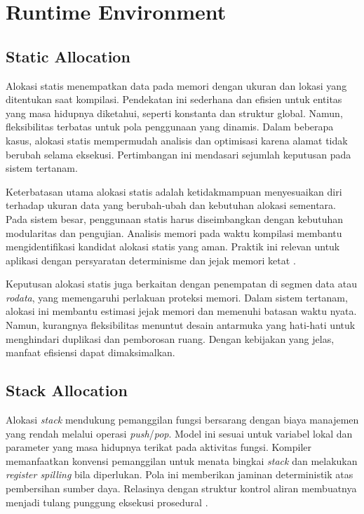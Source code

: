 \documentclass[../main.tex]{subfiles}
\begin{document}
\section{Runtime Environment}
\subsection{Static Allocation}
Alokasi statis menempatkan data pada memori dengan ukuran dan lokasi yang ditentukan saat kompilasi. Pendekatan ini sederhana dan efisien untuk entitas yang masa hidupnya diketahui, seperti konstanta dan struktur global. Namun, fleksibilitas terbatas untuk pola penggunaan yang dinamis. Dalam beberapa kasus, alokasi statis mempermudah analisis dan optimisasi karena alamat tidak berubah selama eksekusi. Pertimbangan ini mendasari sejumlah keputusan pada sistem tertanam.

Keterbatasan utama alokasi statis adalah ketidakmampuan menyesuaikan diri terhadap ukuran data yang berubah-ubah dan kebutuhan alokasi sementara. Pada sistem besar, penggunaan statis harus diseimbangkan dengan kebutuhan modularitas dan pengujian. Analisis memori pada waktu kompilasi membantu mengidentifikasi kandidat alokasi statis yang aman. Praktik ini relevan untuk aplikasi dengan persyaratan determinisme dan jejak memori ketat \citep{WikiMemory}.

Keputusan alokasi statis juga berkaitan dengan penempatan di segmen data atau \emph{rodata}, yang memengaruhi perlakuan proteksi memori. Dalam sistem tertanam, alokasi ini membantu estimasi jejak memori dan memenuhi batasan waktu nyata. Namun, kurangnya fleksibilitas menuntut desain antarmuka yang hati-hati untuk menghindari duplikasi dan pemborosan ruang. Dengan kebijakan yang jelas, manfaat efisiensi dapat dimaksimalkan.

\subsection{Stack Allocation}
Alokasi \emph{stack} mendukung pemanggilan fungsi bersarang dengan biaya manajemen yang rendah melalui operasi \emph{push}/\emph{pop}. Model ini sesuai untuk variabel lokal dan parameter yang masa hidupnya terikat pada aktivitas fungsi. Kompiler memanfaatkan konvensi pemanggilan untuk menata bingkai \emph{stack} dan melakukan \emph{register spilling} bila diperlukan. Pola ini memberikan jaminan deterministik atas pembersihan sumber daya. Relasinya dengan struktur kontrol aliran membuatnya menjadi tulang punggung eksekusi prosedural \citep{WikiCallStack}.
\end{document}
